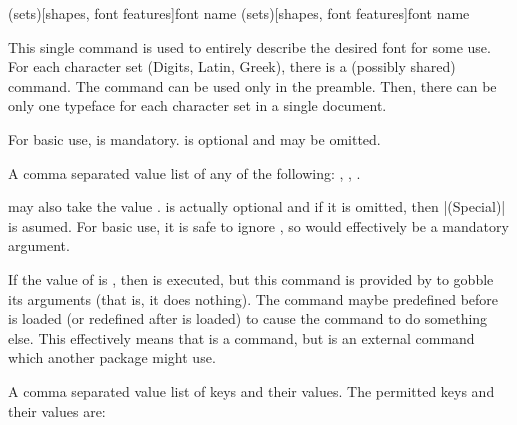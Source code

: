 \documentclass{ltxdockit}
\begin{document}
\begin{ltxsyntax}

  (sets)[shapes, font features]{font name}
  (sets)[shapes, font features]{font name}

  This single command is used to entirely describe the desired font
  for some use. For each character set (Digits, Latin, Greek), there
  is a (possibly shared)  command. The command can
  be used only in the preamble. Then, there can be only one typeface
  for each character set in a single document.

  For basic use,  is mandatory.  is optional and may be omitted.

  \begin{marglist}

  \item[\prm{sets}] A comma separated value list of any of the
    following: , , .

\begin{advanced}
   may also take the value .  is
  actually optional and if it is omitted, then |(Special)| is
  asumed. For basic use, it is safe to ignore , so
   would effectively be a mandatory argument.

  If the value of  is , then
  {\spotcolor{}} is executed, but this command is provided by
   to gobble its arguments (that is, it does
  nothing). The command {\spotcolor{}} maybe
  predefined before  is loaded (or redefined after
   is loaded) to cause the command to do something
  else. This effectively means that
  {\spotcolor{}} is a  command, but
  {\spotcolor{}}
  is an external command which another package might use.
\end{advanced}

\item[\prm{shapes}] A comma separated value list of keys and their
  values. The permitted keys and their values are:

  \begin{optionlist}



\end{optionlist}
\end{marglist}
\end{ltxsyntax}
\end{document}
